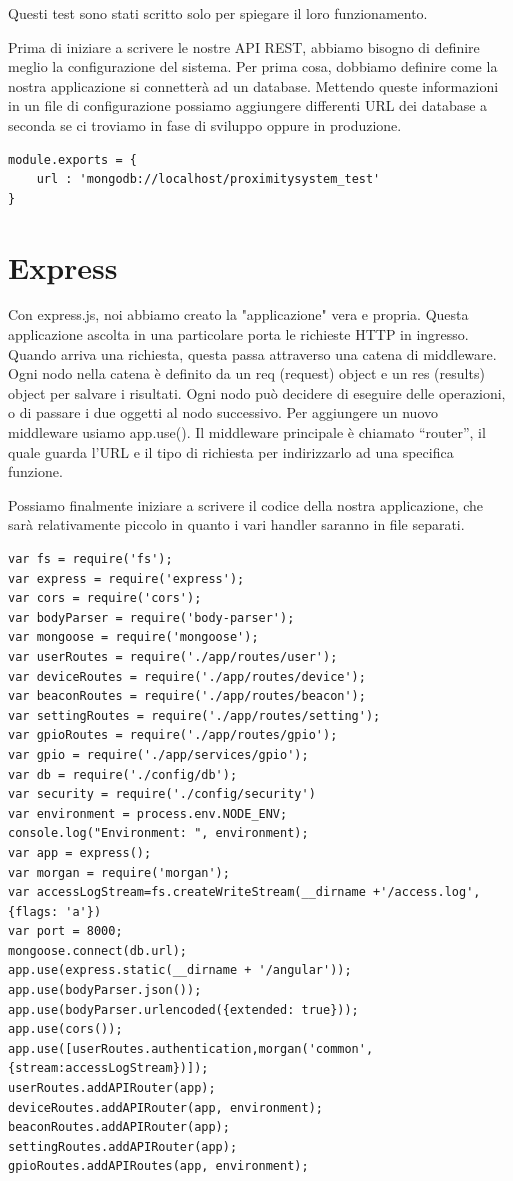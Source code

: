 Questi test sono stati scritto solo per spiegare il loro funzionamento. 

Prima di iniziare a scrivere le nostre API REST, abbiamo bisogno di definire meglio la configurazione del sistema. 
Per prima cosa, dobbiamo definire come la nostra applicazione si connetterà ad un database. 
Mettendo queste informazioni in un file di configurazione possiamo aggiungere differenti URL dei database a seconda se ci troviamo in fase di sviluppo oppure in produzione.

\begin{lstlisting}[caption={config/db.js}, style=javaScriptCode]
module.exports = {
 	url : 'mongodb://localhost/proximitysystem_test'
}
\end{lstlisting}

\section{Express}
Con express.js, noi abbiamo creato la "applicazione" vera e propria. 
Questa applicazione ascolta in una particolare porta le richieste HTTP in ingresso.
Quando arriva una richiesta, questa passa attraverso una catena di middleware.
Ogni nodo nella catena è definito da un req (request) object e un res (results) object per salvare i risultati. 
Ogni nodo può decidere di eseguire delle operazioni, o di passare i due oggetti al nodo successivo. 
Per aggiungere un nuovo middleware usiamo app.use(). 
Il middleware principale è chiamato “router”, il quale guarda l’URL e il tipo di richiesta per indirizzarlo ad una specifica funzione.

Possiamo finalmente iniziare a scrivere il codice della nostra applicazione, 
che sarà relativamente piccolo in quanto i vari handler saranno in file separati.
\begin{lstlisting}[caption={server.js}, style=javaScriptCode]
var fs = require('fs');
var express = require('express');
var cors = require('cors');
var bodyParser = require('body-parser');
var mongoose = require('mongoose');
var userRoutes = require('./app/routes/user');
var deviceRoutes = require('./app/routes/device');
var beaconRoutes = require('./app/routes/beacon');
var settingRoutes = require('./app/routes/setting');
var gpioRoutes = require('./app/routes/gpio');
var gpio = require('./app/services/gpio');
var db = require('./config/db');
var security = require('./config/security')
var environment = process.env.NODE_ENV;
console.log("Environment: ", environment);
var app = express();
var morgan = require('morgan');
var accessLogStream=fs.createWriteStream(__dirname +'/access.log', {flags: 'a'})
var port = 8000;
mongoose.connect(db.url);
app.use(express.static(__dirname + '/angular'));
app.use(bodyParser.json());
app.use(bodyParser.urlencoded({extended: true}));
app.use(cors());
app.use([userRoutes.authentication,morgan('common',{stream:accessLogStream})]);
userRoutes.addAPIRouter(app);
deviceRoutes.addAPIRouter(app, environment);
beaconRoutes.addAPIRouter(app);
settingRoutes.addAPIRouter(app);
gpioRoutes.addAPIRoutes(app, environment);
\end{lstlisting}

